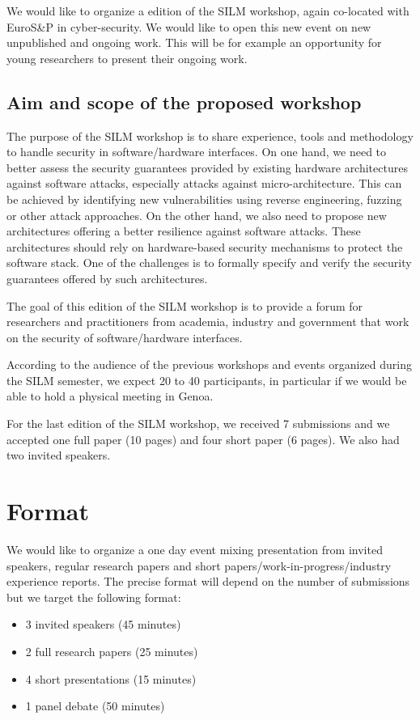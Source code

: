 \documentclass[a4paper,11pt]{article} %
\numberwithin{equation}{section} %
\numberwithin{figure}{section} %
\numberwithin{table}{section} %
\begin{document}
We would like to organize a  edition of the SILM workshop, again
co-located with EuroS\&P in cyber-security. We would like to open this new
event on new unpublished and ongoing work. This will be for example an
opportunity for young researchers to present their ongoing work.

\subsection{Aim and scope of the proposed workshop}

The purpose of the SILM workshop is to share experience, tools and
methodology to handle security in software/hardware interfaces. On one
hand, we need to better assess the security guarantees provided by existing
hardware architectures against software attacks, especially attacks against
micro-architecture. This can be achieved by identifying new vulnerabilities
using reverse engineering, fuzzing or other attack approaches. On the other
hand, we also need to propose new architectures offering a better
resilience against software attacks. These architectures should rely on
hardware-based security mechanisms to protect the software stack. One of
the challenges is to formally specify and verify the security guarantees
offered by such architectures.

The goal of this  edition of the SILM workshop is to provide a forum
for  researchers and practitioners from academia, industry and government
that work on the security of software/hardware interfaces.

According to the audience of the previous workshops and events organized
during the SILM semester, we expect 20 to 40 participants, in particular if
we would be able to hold a physical meeting in Genoa.

For the last edition of the SILM workshop, we received 7 submissions and we
accepted one full paper (10 pages) and four short paper (6 pages). We also
had two invited speakers.

% 

\section{Format}

We would like to organize a one day event mixing presentation from invited
speakers, regular research papers and short
papers/work-in-progress/industry experience reports. The precise format
will depend on the number of submissions but we target the following
format:
%
\begin{itemize}
    \item 3 invited speakers (45 minutes)
    \item 2 full research papers (25 minutes)
    \item 4 short presentations (15 minutes)
    \item 1 panel debate (50 minutes)
\end{itemize}
\end{document}
